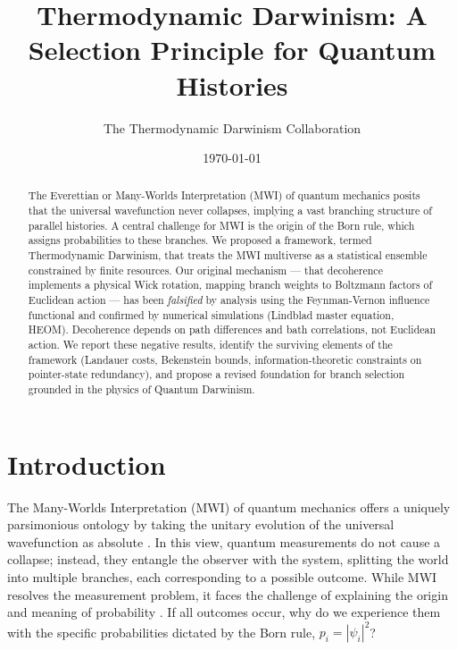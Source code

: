 \documentclass[aps,prl,twocolumn,superscriptaddress,longbibliography]{revtex4-2}
\begin{document}
\title{Thermodynamic Darwinism: A Selection Principle for Quantum Histories}

\author{The Thermodynamic Darwinism Collaboration}

\date{\today}

\begin{abstract}
The Everettian or Many-Worlds Interpretation (MWI) of quantum mechanics posits that the universal wavefunction never collapses, implying a vast branching structure of parallel histories. A central challenge for MWI is the origin of the Born rule, which assigns probabilities to these branches. We proposed a framework, termed Thermodynamic Darwinism, that treats the MWI multiverse as a statistical ensemble constrained by finite resources. Our original mechanism --- that decoherence implements a physical Wick rotation, mapping branch weights to Boltzmann factors of Euclidean action --- has been \emph{falsified} by analysis using the Feynman-Vernon influence functional and confirmed by numerical simulations (Lindblad master equation, HEOM). Decoherence depends on path differences and bath correlations, not Euclidean action. We report these negative results, identify the surviving elements of the framework (Landauer costs, Bekenstein bounds, information-theoretic constraints on pointer-state redundancy), and propose a revised foundation for branch selection grounded in the physics of Quantum Darwinism.
\end{abstract}

\maketitle

\section{Introduction}

The Many-Worlds Interpretation (MWI) of quantum mechanics offers a uniquely parsimonious ontology by taking the unitary evolution of the universal wavefunction as absolute \cite{Everett1957}. In this view, quantum measurements do not cause a collapse; instead, they entangle the observer with the system, splitting the world into multiple branches, each corresponding to a possible outcome. While MWI resolves the measurement problem, it faces the challenge of explaining the origin and meaning of probability \cite{Deutsch1999}. If all outcomes occur, why do we experience them with the specific probabilities dictated by the Born rule, $p_i = |\psi_i|^2$?
\end{document}
